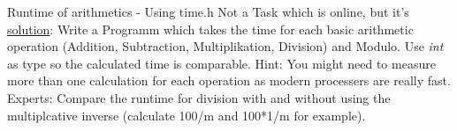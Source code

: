 \begin{frame}{Runtime of arithmetics - Using time.h}
    Not a Task which is online, but it's \href{http://fsr.github.io/c-lessons/exercises/14_alea_iacta_est.html}{solution}: \newline
    Write a Programm which takes the time for each basic arithmetic operation (Addition, Subtraction, Multiplikation, Division) and Modulo. Use \textit{int} 
    as type so the calculated time is comparable. 
    \newline
    \newline
    Hint: You might need to measure more than one calculation for each operation as modern processers are really fast.
    \newline 
    \newline
    Experts: Compare the runtime for division with and without using the multiplcative inverse (calculate 100/m and 100*1/m for example). 
\end{frame}

